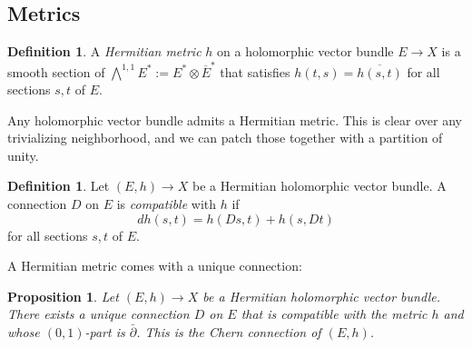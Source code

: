 \documentclass[11pt]{article}
\newtheorem{prop}[theo]{Proposition}
\theoremstyle{definition}
\newtheorem{defi}[theo]{Definition}
\begin{document}
\subsection{Metrics}

\begin{defi}
A \emph{Hermitian metric} $h$ on a holomorphic vector bundle $E \to X$ is a smooth section of $\bigwedge^{1,1}E^* := E^* \otimes \overline E^*$ that satisfies $h(t, s) = \overline{h(s, t)}$ for all sections $s, t$ of $E$.
\end{defi}

Any holomorphic vector bundle admits a Hermitian metric. This is clear over any trivializing neighborhood, and we can patch those together with a partition of unity.


\begin{defi}
Let $(E, h) \to X$ be a Hermitian holomorphic vector bundle. A connection $D$ on $E$ is \emph{compatible} with $h$ if
$$
d h(s, t) = h(Ds, t) + h(s, Dt)
$$
for all sections $s, t$ of $E$.
\end{defi}

A Hermitian metric comes with a unique connection:


\begin{prop}
Let $(E, h) \to X$ be a Hermitian holomorphic vector bundle. There exists a unique connection $D$ on $E$ that is compatible with the metric $h$ and whose $(0,1)$-part is $\bar\partial$. This is the \emph{Chern} connection of $(E,h)$.
\end{prop}
\end{document}
